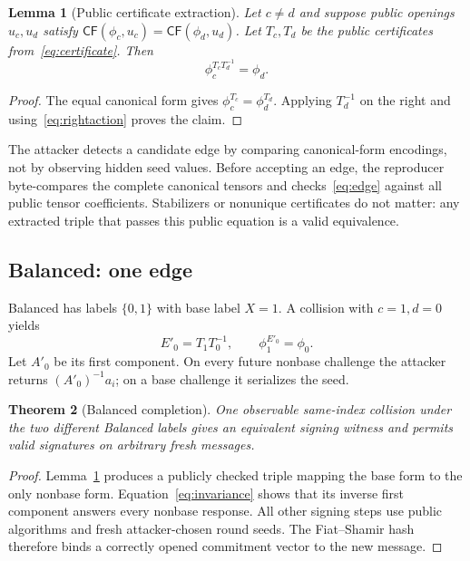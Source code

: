 \documentclass[11pt,a4paper]{article}
\newtheorem{theorem}{Theorem}
\newtheorem{lemma}[theorem]{Lemma}
\newcommand{\CF}{\mathsf{CF}}
\begin{document}
\begin{lemma}[Public certificate extraction]\label{lem:extract}
Let $c\ne d$ and suppose public openings $u_c,u_d$ satisfy
$\CF(\phi_c,u_c)=\CF(\phi_d,u_d)$.  Let $T_c,T_d$ be the public certificates
from~\eqref{eq:certificate}.  Then
\begin{equation}
                         \phi_c^{T_cT_d^{-1}}=\phi_d.   \label{eq:edge}
\end{equation}
\end{lemma}
\begin{proof}
The equal canonical form gives $\phi_c^{T_c}=\phi_d^{T_d}$.  Applying
$T_d^{-1}$ on the right and using~\eqref{eq:rightaction} proves the claim.
\end{proof}

The attacker detects a candidate edge by comparing canonical-form encodings,
not by observing hidden seed values.  Before accepting an edge, the reproducer
byte-compares the complete canonical tensors and checks~\eqref{eq:edge} against
all public tensor coefficients.  Stabilizers or nonunique certificates do not
matter: any extracted triple that passes this public equation is a valid
equivalence.

\subsection{Balanced: one edge}

Balanced has labels $\{0,1\}$ with base label $X=1$.  A collision with
$c=1,d=0$ yields
\[
 E'_0=T_1T_0^{-1},\qquad \phi_1^{E'_0}=\phi_0.
\]
Let $A'_0$ be its first component.  On every future nonbase challenge the
attacker returns $(A'_0)^{-1}a_i$; on a base challenge it serializes the seed.

\begin{theorem}[Balanced completion]\label{thm:balanced}
One observable same-index collision under the two different Balanced labels
gives an equivalent signing witness and permits valid signatures on arbitrary
fresh messages.
\end{theorem}
\begin{proof}
Lemma~\ref{lem:extract} produces a publicly checked triple mapping the base
form to the only nonbase form.  Equation~\eqref{eq:invariance} shows that its
inverse first component answers every nonbase response.  All other signing
steps use public algorithms and fresh attacker-chosen round seeds.  The
Fiat--Shamir hash therefore binds a correctly opened commitment vector to the
new message.
\end{proof}
\end{document}
